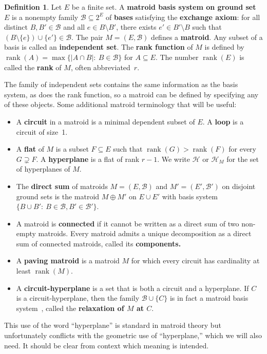 \documentclass[11pt]{amsart}
\theoremstyle{definition}
\newtheorem{definition}[theorem]{Definition}
\newcommand{\0}{\emptyset}
\newcommand{\B}{\mathcal{B}}
\newcommand{\sm}{\setminus}
\newcommand{\defterm}[1]{\textbf{#1}}
\DeclareMathOperator{\rank}{\operatorname{rank}}
\newcommand{\HH}{\mathcal{H}}
\begin{document}
\begin{definition} \label{defn:matroid}
Let $E$ be a finite set.
A \defterm{matroid basis system on ground set $E$} is a nonempty family $\B \subseteq 2^E$ of \defterm{bases} satisfying the \defterm{exchange axiom}: for all distinct $B,B'\in\B$ and all $e\in B\sm B'$, there exists $e'\in B'\sm B$ such that $\left(B\sm \{e\}\right)\cup\{e'\}\in \B$.
The pair $M=(E,\B)$ defines a \defterm{matroid}. 
Any subset of a basis is called an \defterm{independent set}.
The \defterm{rank function} of $M$ is defined by $\rank(A)=\max\{|A\cap B|:\ B\in\B\}$ for $A\subseteq E$.
The number $\rank(E)$ is called the \defterm{rank} of $M$, often abbreviated~$r$.
\end{definition}
The family of independent sets contains the same information as the basis system, as does the rank function, so a matroid can be defined by specifying any of these objects.
Some additional matroid terminology that will be useful:
\begin{itemize}
\item A \defterm{circuit} in a matroid is a minimal dependent subset of $E$.
A \defterm{loop} is a circuit of size~1.
\item A \defterm{flat} of $M$ is a subset $F\subseteq E$ such that $\rank(G)>\rank(F)$ for every $G\supsetneq F$.
A \defterm{hyperplane} is a flat of rank $r-1$. 
We write $\HH$ or $\HH_M$ for the set of hyperplanes of $M$.
\item The \defterm{direct sum} of matroids $M=(E,\B)$ and $M'=(E',\B')$ on disjoint ground sets is the matroid $M\oplus M'$ on $E\cup E'$  with basis system $\{B\cup B':\ B\in \B, B'\in \B'\}$.
\item A matroid is \defterm{connected} if it cannot be written as a direct sum of two non-empty matroids.
Every matroid admits a unique decomposition as a direct sum of connected matroids, called its \defterm{components.}
\item A \defterm{paving matroid} is a matroid $M$ for which every circuit has cardinality at least $\rank(M)$.
\item A \defterm{circuit-hyperplane} is a set that is both a circuit and a hyperplane.  If $C$ is a circuit-hyperplane, then the family $\B\cup\{C\}$ is in fact a matroid basis system~\cite[Prop.1.5.14]{Oxley}, called the \defterm{relaxation of $M$ at $C$}.
\end{itemize}
This use of the word ``hyperplane'' is standard in matroid theory but unfortunately conflicts with the geometric use of ``hyperplane,'' which we will also need.  It should be clear from context which meaning is intended. 
\end{document}

